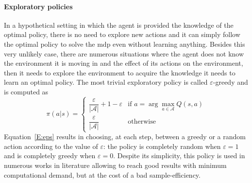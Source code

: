 \paragraph{Exploratory policies}
In a hypothetical setting in which the agent is provided the knowledge of the optimal policy, there is no need to explore new actions and it can simply follow the optimal policy to solve the \gls{mdp} even without learning anything. Besides this very unlikely case, there are numerous situations where the agent does not know the environment it is moving in and the effect of its actions on the environment, then it needs to explore the environment to acquire the knowledge it needs to learn an optimal policy. The most trivial exploratory policy is called $\varepsilon$-greedy and is computed as
\begin{equation}\label{E:eps}
\pi(a|s)=
    \begin{cases}
    \dfrac{\varepsilon}{|\mathcal{A}|} + 1 - \varepsilon & \text{if } a = \arg\max_{a \in \mathcal{A}}Q(s,a)\\
    \dfrac{\varepsilon}{|\mathcal{A}|} & \text{otherwise}
    \end{cases}
\end{equation}
Equation~\ref{E:eps} results in choosing, at each step, between a greedy or a random action according to the value of $\varepsilon$: the policy is completely random when $\varepsilon = 1$ and is completely greedy when $\varepsilon = 0$.
Despite its simplicity, this policy is used in numerous works in literature allowing to reach good results with minimum computational demand, but at the cost of a bad sample-efficiency.

